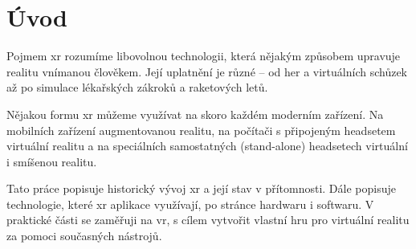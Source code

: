 \chapter*{Úvod}

Pojmem \gls{xr} rozumíme libovolnou technologii, která nějakým způsobem upravuje realitu vnímanou člověkem. Její uplatnění je různé -- od her a virtuálních schůzek až po simulace lékařských zákroků a raketových letů. \cite{muni_kybernetika}

Nějakou formu \gls{xr} můžeme využívat na skoro každém moderním zařízení. Na mobilních zařízení augmentovanou realitu, na počítači s připojeným headsetem virtuální realitu a na speciálních samostatných (stand-alone) headsetech virtuální i smíšenou realitu. 

Tato práce popisuje historický vývoj \gls{xr} a její stav v přítomnosti. Dále popisuje technologie, které \gls{xr} aplikace využívají, po stránce hardwaru i softwaru. V praktické části se zaměřuji na \gls{vr}, s cílem vytvořit vlastní hru pro virtuální realitu za pomoci současných nástrojů.
